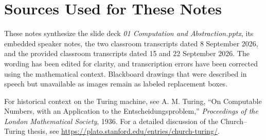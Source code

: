 \documentclass[11pt]{article}
\begin{document}
\section*{Sources Used for These Notes}
These notes synthesize the slide deck \emph{01 Computation and Abstraction.pptx}, its embedded speaker notes, the two classroom transcripts dated 8 September 2026, and the provided classroom transcripts dated 15 and 22 September 2026. The wording has been edited for clarity, and transcription errors have been corrected using the mathematical context. Blackboard drawings that were described in speech but unavailable as images remain as labeled replacement boxes.

For historical context on the Turing machine, see A. M. Turing, ``On Computable Numbers, with an Application to the Entscheidungsproblem,'' \emph{Proceedings of the London Mathematical Society}, 1936. For a detailed discussion of the Church--Turing thesis, see \url{https://plato.stanford.edu/entries/church-turing/}.
\end{document}
